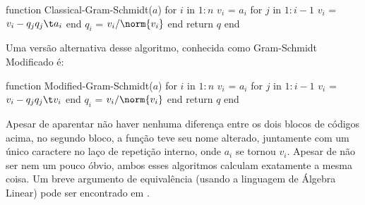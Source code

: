 

\begin{code}
        function Classical-Gram-Schmidt($a$)
            for $i$ in $1:n$
                $v_i$ = $a_i$
                for $j$ in $1:i-1$
                    $v_i$ = $v_i - q_j q_j\t a_i$
                end
                $q_i$ = $v_i / \norm{v_i}$
            end
            return $q$
        end
\end{code}

Uma versão alternativa desse algoritmo, conhecida como Gram-Schmidt Modificado é:

\begin{code}
        function Modified-Gram-Schmidt($a$)
            for $i$ in $1:n$
                $v_i$ = $a_i$
                for $j$ in $1:i-1$
                    $v_i$ = $v_i - q_j q_j\t v_i$
                end
                $q_i$ = $v_i / \norm{v_i}$
            end
            return $q$
        end
\end{code}

Apesar de aparentar não haver nenhuma diferença entre os dois blocos de códigos acima, no segundo bloco, a função teve seu nome alterado, juntamente com um único caractere no laço de repetição interno, onde $a_i$ se tornou $v_i$. Apesar de não ser nem um pouco óbvio, ambos esses algoritmos calculam exatamente a mesma coisa. Um breve argumento de equivalência (usando a linguagem de Álgebra Linear) pode ser encontrado em \cite{TrefethenBau1997}.
